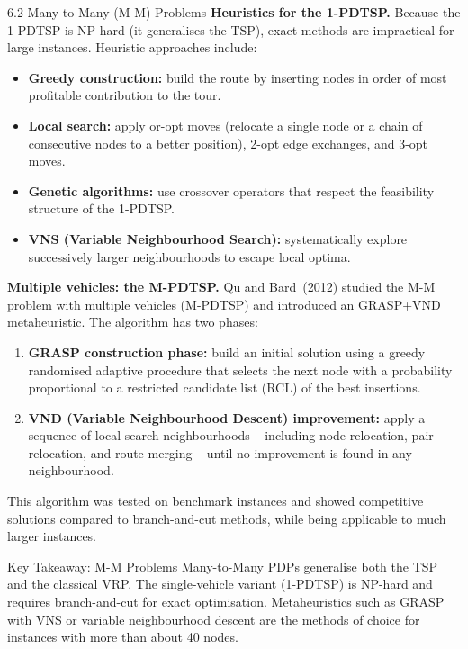 \documentclass[aspectratio=169,10pt]{beamer}
\begin{document}
\begin{frame}[allowframebreaks]{6.2 Many-to-Many (M-M) Problems}
  \textbf{Heuristics for the 1-PDTSP.} Because the 1-PDTSP is NP-hard (it generalises
  the TSP), exact methods are impractical for large instances. Heuristic approaches include:
  \begin{itemize}
    \item \textbf{Greedy construction:} build the route by inserting nodes in order of
          most profitable contribution to the tour.
    \item \textbf{Local search:} apply or-opt moves (relocate a single node or a chain
          of consecutive nodes to a better position), 2-opt edge exchanges, and 3-opt moves.
    \item \textbf{Genetic algorithms:} use crossover operators that respect the
          feasibility structure of the 1-PDTSP.
    \item \textbf{VNS (Variable Neighbourhood Search):} systematically explore successively
          larger neighbourhoods to escape local optima.
  \end{itemize}

  \framebreak

  \textbf{Multiple vehicles: the M-PDTSP.} Qu and Bard~(2012) studied the M-M problem
  with multiple vehicles (M-PDTSP) and introduced an GRASP+VND metaheuristic. The
  algorithm has two phases:
  \begin{enumerate}
    \item \textbf{GRASP construction phase:} build an initial solution using a greedy
          randomised adaptive procedure that selects the next node with a probability
          proportional to a restricted candidate list (RCL) of the best insertions.
    \item \textbf{VND (Variable Neighbourhood Descent) improvement:} apply a sequence
          of local-search neighbourhoods -- including node relocation, pair relocation,
          and route merging -- until no improvement is found in any neighbourhood.
  \end{enumerate}
  This algorithm was tested on benchmark instances and showed competitive solutions
  compared to branch-and-cut methods, while being applicable to much larger instances.

  \begin{alertblock}{Key Takeaway: M-M Problems}
    Many-to-Many PDPs generalise both the TSP and the classical VRP. The single-vehicle
    variant (1-PDTSP) is NP-hard and requires branch-and-cut for exact optimisation.
    Metaheuristics such as GRASP with VNS or variable neighbourhood descent are the
    methods of choice for instances with more than about 40 nodes.
  \end{alertblock}

\end{frame}
\end{document}
